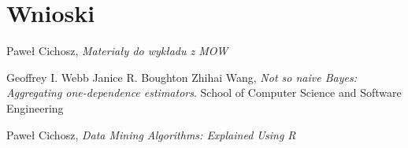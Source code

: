 \documentclass[16]{article}
\begin{document}
\section{Wnioski}


\begin{thebibliography}{9}
	
		Paweł Cichosz,
		\emph{Materiały do wykładu z MOW}
			
		Geoffrey I. Webb
		Janice R. Boughton
		Zhihai Wang,
		\emph{Not so naive Bayes: Aggregating one-dependence estimators}.
		School of Computer Science and Software Engineering
    
		Paweł Cichosz,
		\emph{Data Mining Algorithms: Explained Using R}
\end{thebibliography}
\end{document}
